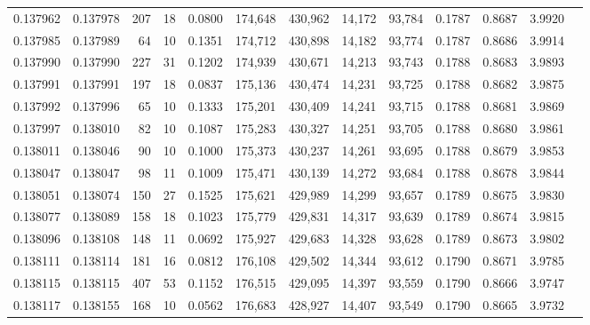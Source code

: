 \begin{tabular}{rrrrrrrrrrrrr}
0.137962 & 0.137978 &   207 &  18 &                                     0.0800 & 174,648 & 430,962 &  14,172 &  93,784 & 0.1787 & 0.8687 & 3.9920 \\
0.137985 & 0.137989 &    64 &  10 &                                     0.1351 & 174,712 & 430,898 &  14,182 &  93,774 & 0.1787 & 0.8686 & 3.9914 \\
0.137990 & 0.137990 &   227 &  31 &                                     0.1202 & 174,939 & 430,671 &  14,213 &  93,743 & 0.1788 & 0.8683 & 3.9893 \\
0.137991 & 0.137991 &   197 &  18 &                                     0.0837 & 175,136 & 430,474 &  14,231 &  93,725 & 0.1788 & 0.8682 & 3.9875 \\
0.137992 & 0.137996 &    65 &  10 &                                     0.1333 & 175,201 & 430,409 &  14,241 &  93,715 & 0.1788 & 0.8681 & 3.9869 \\
0.137997 & 0.138010 &    82 &  10 &                                     0.1087 & 175,283 & 430,327 &  14,251 &  93,705 & 0.1788 & 0.8680 & 3.9861 \\
0.138011 & 0.138046 &    90 &  10 &                                     0.1000 & 175,373 & 430,237 &  14,261 &  93,695 & 0.1788 & 0.8679 & 3.9853 \\
0.138047 & 0.138047 &    98 &  11 &                                     0.1009 & 175,471 & 430,139 &  14,272 &  93,684 & 0.1788 & 0.8678 & 3.9844 \\
0.138051 & 0.138074 &   150 &  27 &                                     0.1525 & 175,621 & 429,989 &  14,299 &  93,657 & 0.1789 & 0.8675 & 3.9830 \\
0.138077 & 0.138089 &   158 &  18 &                                     0.1023 & 175,779 & 429,831 &  14,317 &  93,639 & 0.1789 & 0.8674 & 3.9815 \\
0.138096 & 0.138108 &   148 &  11 &                                     0.0692 & 175,927 & 429,683 &  14,328 &  93,628 & 0.1789 & 0.8673 & 3.9802 \\
0.138111 & 0.138114 &   181 &  16 &                                     0.0812 & 176,108 & 429,502 &  14,344 &  93,612 & 0.1790 & 0.8671 & 3.9785 \\
0.138115 & 0.138115 &   407 &  53 &                                     0.1152 & 176,515 & 429,095 &  14,397 &  93,559 & 0.1790 & 0.8666 & 3.9747 \\
0.138117 & 0.138155 &   168 &  10 &                                     0.0562 & 176,683 & 428,927 &  14,407 &  93,549 & 0.1790 & 0.8665 & 3.9732 \\

\end{tabular}
